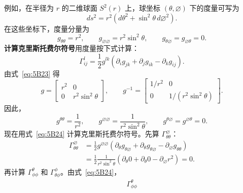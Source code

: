 \begin{enumerate}
\begin{enumerate}[label=\alph*.]
    例如，在半径为 $r$ 的二维球面 $S^2(r)$ 上，球坐标 $(\theta,\varnothing)$ 下的度量可写为
    \[
      ds^2=r^2(d\theta^2+\sin^2\theta\,d\varnothing^2).
    \]
    在这些坐标下，度量分量为
    \begin{equation*}
      g_{\theta\theta}=r^2,\qquad g_{\varnothing\varnothing}=r^2\sin^2\theta,
        \qquad g_{\theta\varnothing}=g_{\varnothing\theta}=0.
      \tag{5B23}\label{eq:5B23}
    \end{equation*}
    \textbf{计算克里斯托费尔符号}\quad 用度量按下式计算：
    \begin{equation*}
      \Gamma^l_{ij}=\frac12g^{lk}
        (\partial_i g_{jk}+\partial_j g_{ik}-\partial_k g_{ij}).
      \tag{5B24}\label{eq:5B24}
    \end{equation*}
    由式~\eqref{eq:5B23} 得
    \[
      g=\begin{bmatrix}r^2&0\\0&r^2\sin^2\theta\end{bmatrix},
      \qquad
      g^{-1}=\begin{bmatrix}
        1/r^2&0\\
        0&1/(r^2\sin^2\theta)
      \end{bmatrix}.
    \]
    因此，
    \begin{equation*}
      g^{\theta\theta}=\frac1{r^2},\qquad
      g^{\varnothing\varnothing}=\frac1{r^2\sin^2\theta},\qquad
      g^{\theta\varnothing}=g^{\varnothing\theta}=0.
      \tag{5B25}\label{eq:5B25}
    \end{equation*}
    现在用式~\eqref{eq:5B24} 计算克里斯托费尔符号。先算 $\Gamma^\varnothing_{\theta\theta}$：
    \begin{equation*}
      \begin{aligned}
        \Gamma^\varnothing_{\theta\theta}
          &=\tfrac12g^{\varnothing\varnothing}
            (\partial_\theta g_{\theta\varnothing}+\partial_\theta g_{\theta\varnothing}
             -\partial_\varnothing g_{\theta\theta})\\
          &=\frac12\frac1{r^2\sin^2\theta}
             (\partial_\theta 0+\partial_\theta 0-\partial_\varnothing r^2)=0.
      \end{aligned}
      \tag{5B26}\label{eq:5B26}
    \end{equation*}
    再计算 $\Gamma^\theta_{\phi\phi}$ 和 $\Gamma^\phi_{\theta\phi}$。由式~\eqref{eq:5B24}，
    \begin{equation*}
      \begin{aligned}
        \Gamma^\theta_{\phi\phi}

\end{aligned}
\end{equation*}
\end{enumerate}
\end{enumerate}
